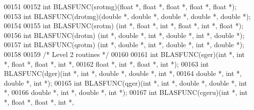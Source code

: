 \begin{DoxyCode}
00151 
00152 \textcolor{keywordtype}{int}    BLASFUNC(srotmg)(\textcolor{keywordtype}{float}  *, \textcolor{keywordtype}{float}  *, \textcolor{keywordtype}{float}  *, \textcolor{keywordtype}{float}  *, \textcolor{keywordtype}{float}  *);
00153 \textcolor{keywordtype}{int}    BLASFUNC(drotmg)(\textcolor{keywordtype}{double} *, \textcolor{keywordtype}{double} *, \textcolor{keywordtype}{double} *, \textcolor{keywordtype}{double} *, \textcolor{keywordtype}{double} *);
00154 
00155 \textcolor{keywordtype}{int}    BLASFUNC(srotm) (\textcolor{keywordtype}{int} *, \textcolor{keywordtype}{float}  *, \textcolor{keywordtype}{int} *, \textcolor{keywordtype}{float}  *, \textcolor{keywordtype}{int} *, \textcolor{keywordtype}{float}  *);
00156 \textcolor{keywordtype}{int}    BLASFUNC(drotm) (\textcolor{keywordtype}{int} *, \textcolor{keywordtype}{double} *, \textcolor{keywordtype}{int} *, \textcolor{keywordtype}{double} *, \textcolor{keywordtype}{int} *, \textcolor{keywordtype}{double} *);
00157 \textcolor{keywordtype}{int}    BLASFUNC(qrotm) (\textcolor{keywordtype}{int} *, \textcolor{keywordtype}{double} *, \textcolor{keywordtype}{int} *, \textcolor{keywordtype}{double} *, \textcolor{keywordtype}{int} *, \textcolor{keywordtype}{double} *);
00158 
00159 \textcolor{comment}{/* Level 2 routines */}
00160 
00161 \textcolor{keywordtype}{int} BLASFUNC(sger)(\textcolor{keywordtype}{int} *,    \textcolor{keywordtype}{int} *, \textcolor{keywordtype}{float} *,  \textcolor{keywordtype}{float} *, \textcolor{keywordtype}{int} *,
00162            \textcolor{keywordtype}{float} *,  \textcolor{keywordtype}{int} *, \textcolor{keywordtype}{float} *,  \textcolor{keywordtype}{int} *);
00163 \textcolor{keywordtype}{int} BLASFUNC(dger)(\textcolor{keywordtype}{int} *,    \textcolor{keywordtype}{int} *, \textcolor{keywordtype}{double} *, \textcolor{keywordtype}{double} *, \textcolor{keywordtype}{int} *,
00164            \textcolor{keywordtype}{double} *, \textcolor{keywordtype}{int} *, \textcolor{keywordtype}{double} *, \textcolor{keywordtype}{int} *);
00165 \textcolor{keywordtype}{int} BLASFUNC(qger)(\textcolor{keywordtype}{int} *,    \textcolor{keywordtype}{int} *, \textcolor{keywordtype}{double} *, \textcolor{keywordtype}{double} *, \textcolor{keywordtype}{int} *,
00166            \textcolor{keywordtype}{double} *, \textcolor{keywordtype}{int} *, \textcolor{keywordtype}{double} *, \textcolor{keywordtype}{int} *);
00167 \textcolor{keywordtype}{int} BLASFUNC(cgeru)(\textcolor{keywordtype}{int} *,    \textcolor{keywordtype}{int} *, \textcolor{keywordtype}{float} *,  \textcolor{keywordtype}{float} *, \textcolor{keywordtype}{int} *,

\end{DoxyCode}
